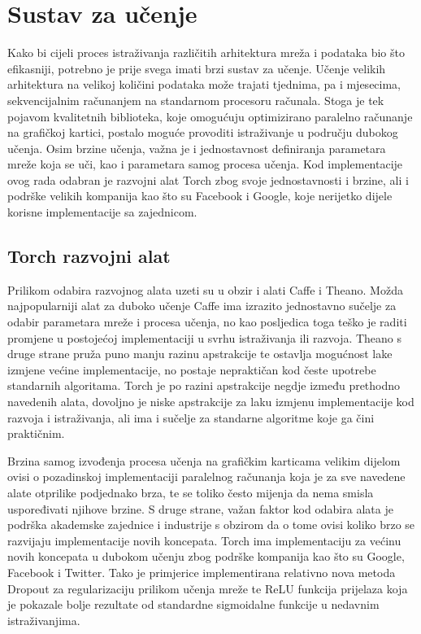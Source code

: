 \documentclass[lmodern, utf8, diplomski, numeric]{fer}
\begin{document}
\section{Sustav za učenje}

Kako bi cijeli proces istraživanja različitih arhitektura mreža i podataka bio što efikasniji, potrebno je prije svega imati brzi sustav za učenje. Učenje velikih arhitektura na velikoj količini podataka može trajati tjednima, pa i mjesecima, sekvencijalnim računanjem na standarnom procesoru računala. Stoga je tek pojavom kvalitetnih biblioteka, koje omogućuju optimizirano paralelno računanje na grafičkoj kartici, postalo moguće provoditi istraživanje u području dubokog učenja. 
Osim brzine učenja, važna je i jednostavnost definiranja parametara mreže koja se uči, kao i parametara samog procesa učenja. Kod implementacije ovog rada odabran je razvojni alat Torch zbog svoje jednostavnosti i brzine, ali i podrške velikih kompanija kao što su Facebook i Google, koje nerijetko dijele korisne implementacije sa zajednicom. 

\subsection{Torch razvojni alat}

Prilikom odabira razvojnog alata uzeti su u obzir i alati Caffe i Theano. Možda najpopularniji alat za duboko učenje Caffe ima izrazito jednostavno sučelje za odabir parametara mreže i procesa učenja, no kao posljedica toga teško je raditi promjene u postojećoj implementaciji u svrhu istraživanja ili razvoja. Theano s druge strane pruža puno manju razinu apstrakcije te ostavlja mogućnost lake izmjene većine implementacije, no postaje nepraktičan kod česte upotrebe standarnih algoritama.
Torch je po razini apstrakcije negdje između prethodno navedenih alata, dovoljno je niske apstrakcije za laku izmjenu implementacije kod razvoja i istraživanja, ali ima i sučelje za standarne algoritme koje ga čini praktičnim. 

Brzina samog izvođenja procesa učenja na grafičkim karticama velikim dijelom ovisi o pozadinskoj implementaciji paralelnog računanja koja je za sve navedene alate otprilike podjednako brza, te se toliko često mijenja da nema smisla uspoređivati njihove brzine. S druge strane, važan faktor kod odabira alata je podrška akademske zajednice i industrije s obzirom da o tome ovisi koliko brzo se razvijaju implementacije novih koncepata. Torch ima implementaciju za većinu novih koncepata u dubokom učenju zbog podrške kompanija kao što su Google, Facebook i Twitter.  Tako je primjerice implementirana relativno nova metoda Dropout za regularizaciju prilikom učenja mreže te ReLU funkcija prijelaza koja je pokazale bolje rezultate od standardne sigmoidalne funkcije u nedavnim istraživanjima.
\end{document}

